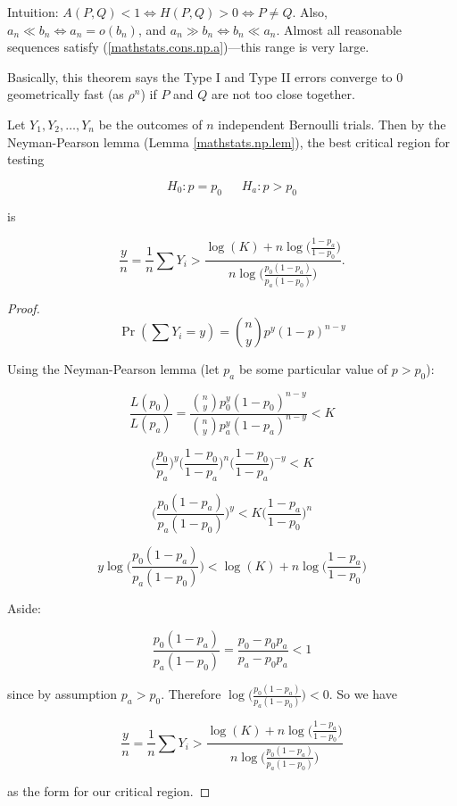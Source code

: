 \begin{remark}

Intuition: \( A(P,Q) < 1 \iff  H(P, Q) > 0 \iff P \neq Q\). Also, \(a_n \ll b_n \iff a_n = o(b_n)\), and \(a_n \gg b_n \iff b_n \ll a_n\). Almost all reasonable sequences satisfy (\ref{mathstats.cons.np.a})---this range is very large. 

Basically, this theorem says the Type I and Type II errors converge to 0 geometrically fast (as \(\rho^n\)) if \(P\) and \(Q\) are not too close together.

\end{remark}

\begin{proposition} Let \(Y_1, Y_2, \ldots, Y_n\) be the outcomes of \(n\) independent Bernoulli trials. Then by the Neyman-Pearson lemma (Lemma \ref{mathstats.np.lem}), the best critical region for testing

\[
H_0: p = p_0 \ \ \ \ \ \ \ H_a: p > p_0
\]

is

\[
\frac{y}{n} = \frac{1}{n}\sum Y_i  > \frac{\log(K) + n \log \bigg( \frac{1 - p_a}{1 - p_0} \bigg)}{n\log \bigg( \frac{p_0(1 - p_a)}{p_a(1 - p_0)} \bigg)}.
\]

\end{proposition}

\begin{proof}

\[
\Pr(\sum Y_i = y) = {n \choose y}p^y(1-p)^{n-y}
\]

Using the Neyman-Pearson lemma (let \(p_a\) be some particular value of \(p > p_0\)):

\[
\frac{L(p_0)}{L(p_a)} = \frac{{n \choose y}p_0^y(1-p_0)^{n-y}}{{n \choose y}p_a^y(1-p_a)^{n-y}} < K
\]

\[
\bigg( \frac{p_0}{p_a} \bigg) ^y   \bigg( \frac{1 - p_0}{1 - p_a} \bigg)^{n} \bigg( \frac{1 - p_0}{1 - p_a} \bigg)^{-y}  < K
\]

\[
\bigg( \frac{p_0(1 - p_a)}{p_a(1 - p_0)} \bigg) ^y  < K  \bigg( \frac{1 - p_a}{1 - p_0} \bigg)^{n} 
\]

\[
y \log \bigg( \frac{p_0(1 - p_a)}{p_a(1 - p_0)} \bigg) < \log(K) + n \log \bigg( \frac{1 - p_a}{1 - p_0} \bigg)
\]

Aside:

\[
\frac{p_0(1 - p_a)}{p_a(1 - p_0)} = \frac{p_0 - p_0 p_a}{p_a - p_0 p_a} < 1
\]

since by assumption \(p_a > p_0\). Therefore \( \log \bigg( \frac{p_0(1 - p_a)}{p_a(1 - p_0)} \bigg) < 0 \). So we have

\[
\frac{y}{n} = \frac{1}{n}\sum Y_i  > \frac{\log(K) + n \log \bigg( \frac{1 - p_a}{1 - p_0} \bigg)}{n\log \bigg( \frac{p_0(1 - p_a)}{p_a(1 - p_0)} \bigg)}
\]

as the form for our critical region.

\end{proof}

